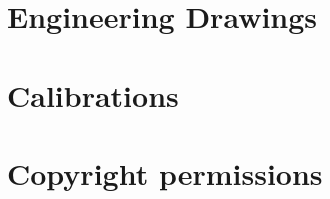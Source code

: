 \documentclass[12pt]{report}  %
\begin{document}
%


%

%

%

\appendix %
%

\chapter{Engineering Drawings} \label{sec:appa}



\chapter{Calibrations} \label{sec:appb}



\chapter{Copyright permissions}\label{sec:appc}




\printnoidxglossaries


%


%

\end{document}
